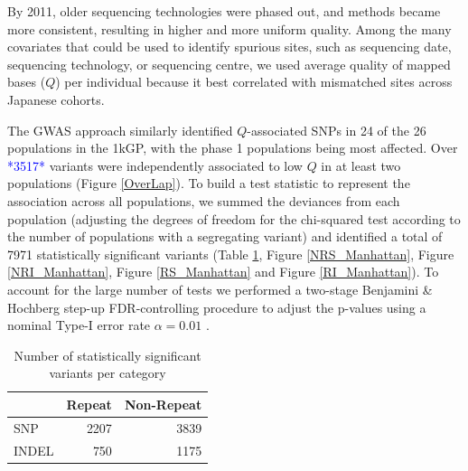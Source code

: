 \documentclass[9pt,lineno]{elife}
\newcommand{\todo}[1]{\textcolor{blue}{*#1*}}
\begin{document}
By 2011, older sequencing technologies were phased out, and methods became more consistent, resulting in higher and more uniform quality.
Among the many covariates that could be used to identify spurious sites, such as sequencing date, sequencing technology, or sequencing centre, we used average quality of mapped bases ($Q$) per individual because it best correlated with mismatched sites across Japanese cohorts.

The GWAS approach similarly identified $Q$-associated SNPs in 24 of the 26 populations in the 1kGP, with the phase 1 populations being most affected.
Over \todo{3517} variants were independently associated to low $Q$ in at least two populations  (Figure \ref{OverLap}). 
To build a test statistic to represent the association across all populations, we summed the deviances from each population (adjusting the degrees of freedom for the chi-squared test according to the number of populations with a segregating variant) and identified a total of 7971 statistically significant variants (Table \ref{sigTable}, Figure \ref{NRS_Manhattan}, Figure \ref{NRI_Manhattan}, Figure \ref{RS_Manhattan} and Figure \ref{RI_Manhattan}).
To account for the large number of tests we performed a two-stage Benjamini \& Hochberg step-up FDR-controlling procedure to adjust the p-values using a nominal Type-I error rate $\alpha = 0.01$ \citep{Benjamini2006}.

\begin{table}[h]
\begin{tabular}{l  r r}
                      & {Repeat}  & {Non-Repeat}       \\ \hline
{SNP}  & 2207 & 3839 \\  
{INDEL} & 750  & 1175 \\ \hline
\end{tabular}
\caption{Number of statistically significant variants per category}
\label{sigTable}
\end{table}
\end{document}
